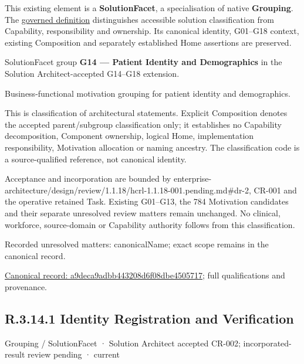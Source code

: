 This existing element is a \textbf{SolutionFacet}, a specialisation of native
\textbf{Grouping}. The \href{\detokenize{../../../../../../../governance/continuum-representation.md#solutionfacet-classification--1119-candidate}}{governed definition}
distinguishes accessible solution classification from Capability, responsibility
and ownership. Its canonical identity, G01–G18 context, existing Composition
and separately established Home assertions are preserved.



SolutionFacet group \textbf{G14 — Patient Identity and Demographics} in the Solution Architect-accepted G14–G18 extension.



Business-functional motivation grouping for patient identity and demographics.



This is classification of architectural statements. Explicit Composition denotes the accepted parent/subgroup classification only; it establishes no Capability decomposition, Component ownership, logical Home, implementation responsibility, Motivation allocation or naming ancestry. The classification code is a source-qualified reference, not canonical identity.



Acceptance and incorporation are bounded by enterprise-architecture/design/review/1.1.18/hcrl-1.1.18-001.pending.md\#dr-2, CR-001 and the operative retained Task. Existing G01–G13, the 784 Motivation candidates and their separate unresolved review matters remain unchanged. No clinical, workforce, source-domain or Capability authority follows from this classification.


{\small Recorded unresolved matters: canonicalName; exact scope remains in the canonical record.}\par
{\footnotesize \href{../../../../../../../continuum/grouping/a9deca9adbb443208d6f08dbe4505717.md}{Canonical record: a9deca9adbb443208d6f08dbe4505717}; full qualifications and provenance.}\par
\subsection*{R.3.14.1 Identity Registration and Verification}
\label{navigation:R.3.14.1}

\label{element:5fcada54e6df40a8983335a90e4a9f02}
{\small Grouping / SolutionFacet · Solution Architect accepted CR-002; incorporated-result review pending · current}\par

